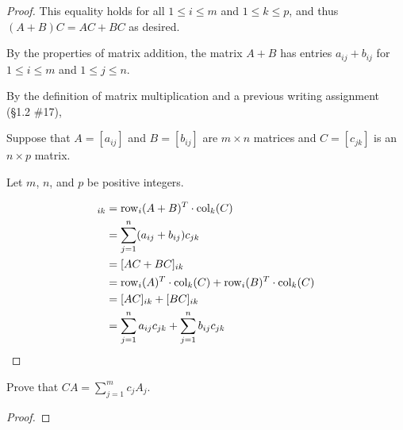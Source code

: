 \documentclass{article}
\begin{document}
\begin{proof}

    This equality holds for all $1 \leq i \leq m$ and $1 \leq k \leq p$, and thus $(A+B)C = AC + BC$ as desired.

    By the properties of matrix addition, the matrix $A+B$ has entries $a_{ij} + b_{ij}$ for $1 \leq i \leq m$ and $1 \leq j \leq n$. 
    
    By the definition of matrix multiplication and a previous writing assignment (\S1.2 \#17), 
    
    Suppose that $A = [a_{ij}]$ and $B = [b_{ij}]$ are $m\times n$ matrices and $C = [c_{jk}]$ is an $n \times p$ matrix. %
    
    Let $m$, $n$, and $p$ be positive integers. 
    
    \begin{align*}
    [(A+B)C]_{ik} 
        &= \Row_{i}(A+B)^T \cdot \Col_{k}(C) \\ 
        &= \sum_{j = 1}^n (a_{ij} + b_{ij})c_{jk}\\ 
        &= [AC + BC]_{ik}\\ 
        &= \Row_{i}(A)^T\cdot \Col_k(C) + \Row_{i}(B)^T \cdot \Col_k(C)\\ 
        &= [AC]_{ik} + [BC]_{ik}\\ 
        &= \sum_{j = 1}^n a_{ij}c_{jk} + \sum_{j = 1}^n b_{ij}c_{jk} 
    \end{align*}

\end{proof}

\begin{thm*}[\S1.4, \#7] 
    Prove that $CA = \sum_{j = 1}^m c_j A_j$. 
\end{thm*}


\begin{proof} 
\end{proof}
\end{document}
